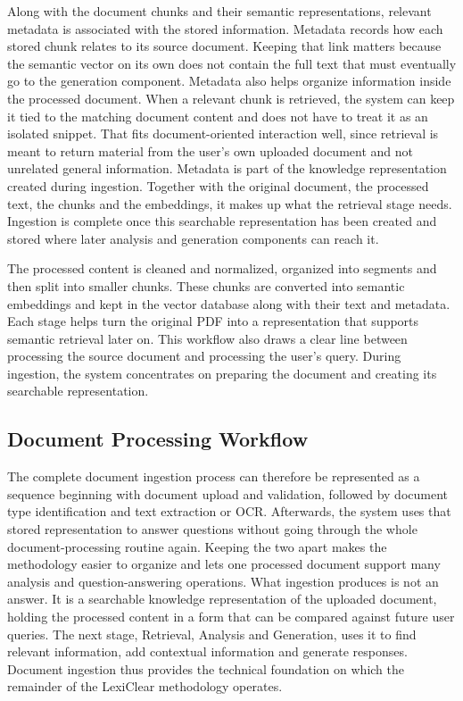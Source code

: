 \documentclass[12pt,a4paper,oneside]{report}
\begin{document}
Along with the document chunks and their semantic representations, relevant
metadata is associated with the stored information. Metadata records how each stored chunk relates to its source document. Keeping that link matters because the semantic vector on its own does not contain the full text that must eventually go to the generation component. Metadata also helps organize information inside the processed document. When a relevant chunk is retrieved, the system can keep it tied to the matching document content and does not have to treat it as an isolated snippet. That fits document-oriented interaction well, since retrieval is meant to return material from the user's own uploaded document and not unrelated general information. Metadata is part of the knowledge representation created during ingestion. Together with the original document, the processed text, the chunks and the embeddings, it makes up what the retrieval stage needs. Ingestion is complete once this searchable representation has been created and stored where later analysis and generation components can reach it.

The processed content is cleaned and normalized, organized into segments and then split into smaller chunks. These chunks are converted into semantic embeddings and kept in the vector database along with their text and metadata. Each stage helps turn the original PDF into a representation that supports semantic retrieval later on. This workflow also draws a clear line between processing the source document and processing the user's query. During ingestion, the system concentrates on preparing the document and creating its searchable representation.

\subsection{Document Processing Workflow}

The complete document ingestion process can therefore be represented as a
sequence beginning with document upload and validation, followed by document
type identification and text extraction or OCR. Afterwards, the system uses that stored representation to answer questions without going through the whole document-processing routine again. Keeping the two apart makes the methodology easier to organize and lets one processed document support many analysis and question-answering operations. What ingestion produces is not an answer. It is a searchable knowledge representation of the uploaded document, holding the processed content in a form that can be compared against future user queries. The next stage, Retrieval, Analysis and Generation, uses it to find relevant information, add contextual information and generate responses. Document
ingestion thus provides the technical foundation on which the remainder of
the LexiClear methodology operates.
\end{document}
